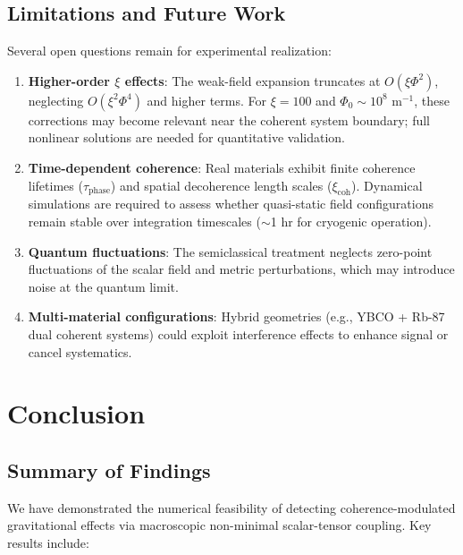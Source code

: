 \documentclass[10pt,twocolumn]{article}
\begin{document}
\subsection{Limitations and Future Work}

Several open questions remain for experimental realization:

\begin{enumerate}
\item \textbf{Higher-order $\xi$ effects}: The weak-field expansion truncates at $O(\xi\Phi^2)$, neglecting $O(\xi^2\Phi^4)$ and higher terms. For $\xi = 100$ and $\Phi_0 \sim 10^8$ m$^{-1}$, these corrections may become relevant near the coherent system boundary; full nonlinear solutions are needed for quantitative validation.

\item \textbf{Time-dependent coherence}: Real materials exhibit finite coherence lifetimes ($\tau_{\text{phase}}$) and spatial decoherence length scales ($\xi_{\text{coh}}$). Dynamical simulations are required to assess whether quasi-static field configurations remain stable over integration timescales ($\sim$1 hr for cryogenic operation).

\item \textbf{Quantum fluctuations}: The semiclassical treatment neglects zero-point fluctuations of the scalar field and metric perturbations, which may introduce noise at the quantum limit.

\item \textbf{Multi-material configurations}: Hybrid geometries (e.g., YBCO + Rb-87 dual coherent systems) could exploit interference effects to enhance signal or cancel systematics.
\end{enumerate}

\section{Conclusion}

\subsection{Summary of Findings}

We have demonstrated the numerical feasibility of detecting coherence-modulated gravitational effects via macroscopic non-minimal scalar-tensor coupling. Key results include:
\end{document}
